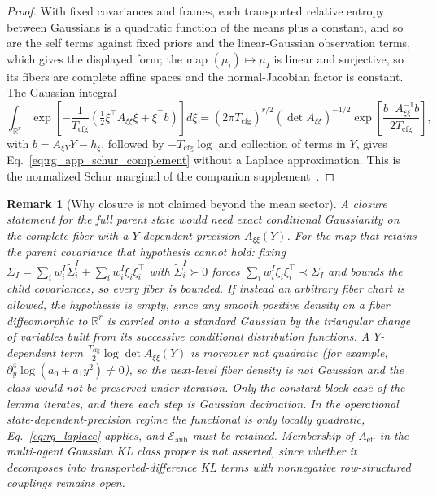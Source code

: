 \documentclass[11pt]{article}
\newtheorem{remark}{Remark}
\begin{document}
\begin{proof}
With fixed covariances and frames, each transported relative entropy between Gaussians is a quadratic function of the means plus a constant, and so are the self terms against fixed priors and the linear-Gaussian observation terms, which gives the displayed form; the map $(\mu_i)\mapsto\mu_I$ is linear and surjective, so its fibers are complete affine spaces and the normal-Jacobian factor is constant. The Gaussian integral
\begin{equation}
\int_{\mathbb{R}^r}\exp\left[-\frac{1}{T_{\mathrm{cfg}}}\left(\tfrac12\xi^\top A_{\xi\xi}\xi+\xi^\top b\right)\right]d\xi
=(2\pi T_{\mathrm{cfg}})^{r/2}(\det A_{\xi\xi})^{-1/2}\exp\left[\frac{b^\top A_{\xi\xi}^{-1}b}{2T_{\mathrm{cfg}}}\right],
\end{equation}
with $b=A_{\xi Y}Y-h_\xi$, followed by $-T_{\mathrm{cfg}}\log$ and collection of terms in $Y$, gives Eq.~\eqref{eq:rg_app_schur_complement} without a Laplace approximation. This is the normalized Schur marginal of the companion supplement~\cite[Ch.~G7]{DennisGaugeVFESuppG2026}.
\end{proof}

\begin{remark}[Why closure is not claimed beyond the mean sector]
A closure statement for the full parent state would need exact conditional Gaussianity on the complete fiber with a $Y$-dependent precision $A_{\xi\xi}(Y)$. For the map that retains the parent covariance that hypothesis cannot hold: fixing $\Sigma_I=\sum_iw_i^I\widetilde{\Sigma}_i^I+\sum_iw_i^I\xi_i\xi_i^\top$ with $\widetilde{\Sigma}_i^I\succ0$ forces $\sum_iw_i^I\xi_i\xi_i^\top\prec\Sigma_I$ and bounds the child covariances, so every fiber is bounded. If instead an arbitrary fiber chart is allowed, the hypothesis is empty, since any smooth positive density on a fiber diffeomorphic to $\mathbb{R}^r$ is carried onto a standard Gaussian by the triangular change of variables built from its successive conditional distribution functions. A $Y$-dependent term $\tfrac{T_{\mathrm{cfg}}}{2}\log\det A_{\xi\xi}(Y)$ is moreover not quadratic (for example, $\partial_y^4\log(a_0+a_1y^2)\neq0$), so the next-level fiber density is not Gaussian and the class would not be preserved under iteration. Only the constant-block case of the lemma iterates, and there each step is Gaussian decimation. In the operational state-dependent-precision regime the functional is only locally quadratic, Eq.~\eqref{eq:rg_laplace} applies, and $\mathcal{E}_{\mathrm{anh}}$ must be retained. Membership of $A_{\mathrm{eff}}$ in the multi-agent Gaussian KL class proper is not asserted, since whether it decomposes into transported-difference KL terms with nonnegative row-structured couplings remains open.
\end{remark}
\end{document}
